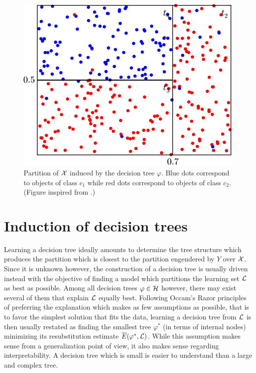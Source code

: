 \begin{figure}
    \centering
    \includegraphics[scale=0.5]{figures/ch3_partition.pdf}
    \caption{Partition of ${\cal X}$ induced by the decision tree $\varphi$.
             Blue dots correspond to objects of class $c_1$ while red dots correspond
             to objects of class $c_2$. (Figure inspired from \citet{breiman:1984}.)}
    \label{fig:3:partition}
\end{figure}


\section{Induction of decision trees}
\label{sec:3:induction}

Learning a decision tree ideally amounts to determine the tree structure which
produces the partition which is closest to the partition engendered by $Y$ over
${\cal X}$. Since it is unknown however, the construction of a decision tree is usually
driven instead with the objective of finding a model which partitions the
learning set ${\cal L}$ as best as possible. Among all decision trees $\varphi
\in {\cal H}$ however, there may exist several of them that explain ${\cal L}$
equally best. Following Occam's Razor principles~\citep{blumer:1987} of preferring the explanation
which makes as few assumptions as possible, that is to favor the simplest
solution that fits the data, learning a decision tree from ${\cal L}$ is then
usually restated as finding the smallest tree $\varphi^*$ (in terms of internal nodes) minimizing its
resubstitution estimate $\overline{E}(\varphi^*, {\cal L})$. While this
assumption makes sense from a generalization point of view, it also makes
sense regarding interpretability. A decision tree which is small is easier
to understand than a large and complex tree.

